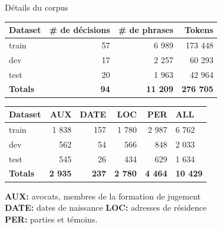 \documentclass[10pt]{beamer}
\begin{document}
\begin{frame}{Détails du corpus}
	\begin{center}

	\begin{tabular}{@{}lrrr@{}}
	\toprule
	\textbf{Dataset} & \textbf{\# de décisions} & \textbf{\# de phrases} & \textbf{Tokens} \\ \midrule
	train        & 57                           &  6 989                         & 173 448             \\
	dev          & 17                            & 2 257                         & 60 293        \\
	test         & 20                            & 1 963                         & 42 964        \\ \bottomrule
	\textbf{Totals}           & \textbf{94}                           & \textbf{11 209}                         & \textbf{276 705}\\ \bottomrule
\end{tabular}
	
	\begin{tabular}{@{}lrrrr|l@{}}
	\toprule
	\textbf{Dataset}&\textbf{AUX} & \textbf{DATE} & \textbf{LOC} & \textbf{PER} & \textbf{ALL} \\ \midrule
	train & 1 838         & 157           & 1 780         & 2 987         & 6 762         \\
	dev & 562          & 54            & 566          & 848          & 2 033         \\
	test & 545          & 26            & 434          & 629          & 1 634         \\ \bottomrule
	\textbf{Totals} &	\textbf{2 935}         & \textbf{237}            & \textbf{2 780}          & \textbf{4 464}          & \textbf{10 429}         \\ \bottomrule

\end{tabular}

\end{center}

\textbf{AUX:} avocats, membres de la formation de jugement \\
\textbf{DATE:} dates de naissance \textbf{LOC:} adresses de résidence\\
\textbf{PER:} parties et témoins.
\end{frame}
\end{document}
